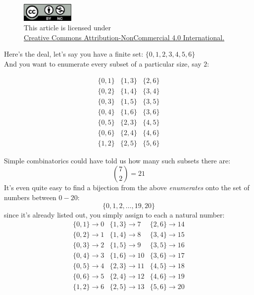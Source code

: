 \documentclass[twoside]{article}
\begin{document}
\begin{figure}[h]
\centering
\includegraphics[width=1in]{cc-by-nc.png}\\[0.1in]
\tiny This article is licensed under \\
\href{http://creativecommons.org/licenses/by-nc/4.0/}
{Creative Commons Attribution-NonCommercial 4.0 International.}\\[0.3in]
\end{figure}

Here's the deal, let's say you have a finite set: $ \{0, 1, 2, 3, 4, 5, 6\} $\\[0.1cm]

And you want to enumerate every subset of a particular size, say $ 2 $:

$$ \begin{array}{ccc}
\{0, 1\} & \{1, 3\} & \{2, 6\} \\
\{0, 2\} & \{1, 4\} & \{3, 4\} \\
\{0, 3\} & \{1, 5\} & \{3, 5\} \\
\{0, 4\} & \{1, 6\} & \{3, 6\} \\
\{0, 5\} & \{2, 3\} & \{4, 5\} \\
\{0, 6\} & \{2, 4\} & \{4, 6\} \\
\{1, 2\} & \{2, 5\} & \{5, 6\}
\end{array} $$

Simple combinatorics could have told us how many such subsets there are:
$$ {7\choose 2}=21 $$
It's even quite easy to find a bijection from the above \emph{enumerates} onto the set of numbers between $ 0-20 $:
$$ \{0, 1, 2,\ldots , 19, 20\} $$
since it's already listed out, you simply assign to each a natural number:
$$ \begin{array}{lll}
\{0, 1\} \to 0 & \{1, 3\} \to 7 & \{2, 6\} \to 14 \\
\{0, 2\} \to 1 & \{1, 4\} \to 8 & \{3, 4\} \to 15 \\
\{0, 3\} \to 2 & \{1, 5\} \to 9 & \{3, 5\} \to 16 \\
\{0, 4\} \to 3 & \{1, 6\} \to 10 & \{3, 6\} \to 17 \\
\{0, 5\} \to 4 & \{2, 3\} \to 11 & \{4, 5\} \to 18 \\
\{0, 6\} \to 5 & \{2, 4\} \to 12 & \{4, 6\} \to 19 \\
\{1, 2\} \to 6 & \{2, 5\} \to 13 & \{5, 6\} \to 20
\end{array} $$
\end{document}

